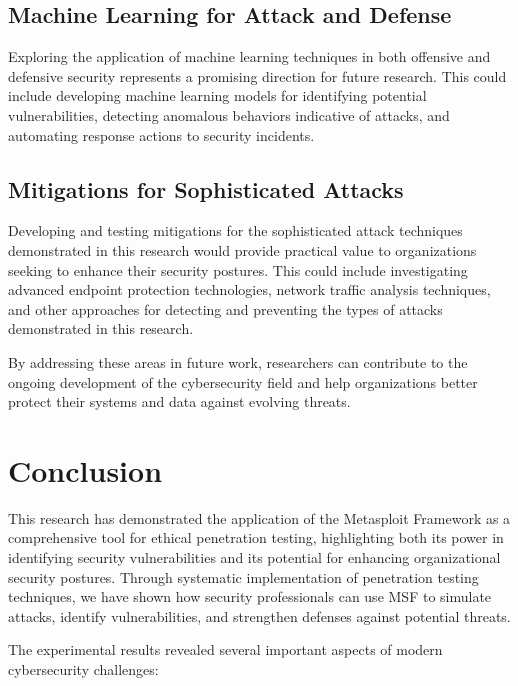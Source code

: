 \documentclass[journal,twoside]{IEEEtran}
\begin{document}
\subsection{Machine Learning for Attack and Defense}
Exploring the application of machine learning techniques in both offensive and defensive security represents a promising direction for future research. This could include developing machine learning models for identifying potential vulnerabilities, detecting anomalous behaviors indicative of attacks, and automating response actions to security incidents.

\subsection{Mitigations for Sophisticated Attacks}
Developing and testing mitigations for the sophisticated attack techniques demonstrated in this research would provide practical value to organizations seeking to enhance their security postures. This could include investigating advanced endpoint protection technologies, network traffic analysis techniques, and other approaches for detecting and preventing the types of attacks demonstrated in this research.

By addressing these areas in future work, researchers can contribute to the ongoing development of the cybersecurity field and help organizations better protect their systems and data against evolving threats.

\section{Conclusion}
This research has demonstrated the application of the Metasploit Framework as a comprehensive tool for ethical penetration testing, highlighting both its power in identifying security vulnerabilities and its potential for enhancing organizational security postures. Through systematic implementation of penetration testing techniques, we have shown how security professionals can use MSF to simulate attacks, identify vulnerabilities, and strengthen defenses against potential threats.

The experimental results revealed several important aspects of modern cybersecurity challenges:
\end{document}
